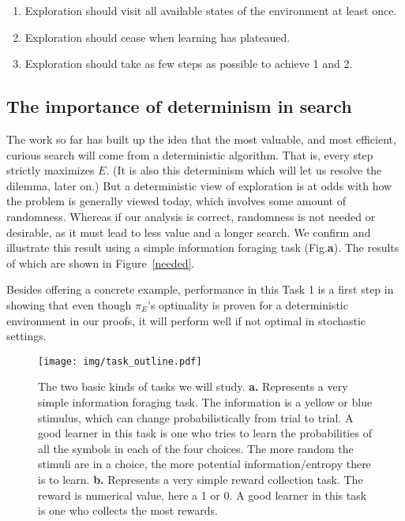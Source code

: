 \begin{enumerate}
	\item Exploration should visit all available states of the environment at least once.
	\item Exploration should cease when learning has plateaued.
	\item Exploration should take as few steps as possible to achieve 1 and 2.
\end{enumerate}

\subsection{The importance of determinism in search}
The work so far has built up the idea that the most valuable, and most efficient, curious search will come from a deterministic algorithm. That is, every step strictly maximizes $E$. (It is also this determinism which will let us resolve the dilemma, later on.) But a deterministic view of exploration is at odds with how the problem is generally viewed today, which involves some amount of randomness. Whereas if our analysis is correct, randomness is not needed or desirable, as it must lead to less value and a longer search. We confirm and illustrate this result using a simple information foraging task (Fig.\label{fig:task_outline}\textbf{a}). The results of which are shown in Figure~\ref{needed}. 

Besides offering a concrete example, performance in this Task 1 is a first step in showing that even though $\pi_E$'s optimality is proven for a deterministic environment in our proofs, it will perform well if not optimal in stochastic settings.

\begin{figure}
	\begin{fullwidth}
	\texttt{[image: img/task\_outline.pdf]} 
	\caption{The two basic kinds of tasks we will study.	
\textbf{a.} Represents a very simple information foraging task. The information is a yellow or blue stimulus, which can change probabilistically from trial to trial. A good learner in this task is one who tries to learn the probabilities of all the symbols in each of the four choices. The more random the stimuli are in a choice, the more potential information/entropy there is to learn.  
	\textbf{b.} Represents a very simple reward collection task. The reward is numerical value, here a 1 or 0. A good learner in this task is one who collects the most rewards.}
	\label{fig:task_outline} 
	\end{fullwidth}
\end{figure}

